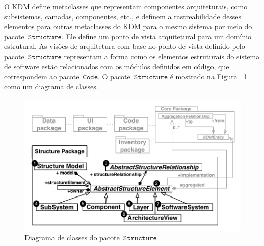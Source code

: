 O KDM define metaclasses que representam componentes arquiteturais, como subsistemas, camadas, componentes, etc., e definem a rastreabilidade desses elementos para outras metaclasses do KDM para o mesmo sistema por meio do pacote~$\mathtt{Structure}$. Ele define um ponto de vista arquitetural para um domínio estrutural. As visões de arquitetura com base no ponto de vista definido pelo pacote~$\mathtt{Structure}$ representam a forma como os elementos estruturais do sistema de software estão relacionados com os módulos definidos em código, que correspondem ao pacote~$\mathtt{Code}$. O pacote~$\mathtt{Structure}$ é mostrado na Figura ~\ref{fig:structureModel} como um diagrama de classes.

\begin{figure}[t]
	\centering
	\caption{Diagrama de classes do pacote~$\mathtt{Structure}$\label{fig:structureModel}}
	\includegraphics[scale=0.8]{images/StructurePackageFigure}
\end{figure}



